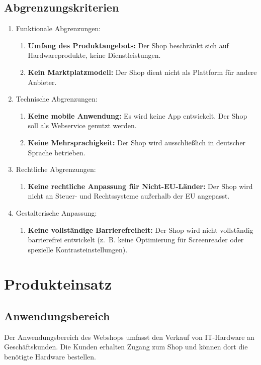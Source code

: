 \documentclass[%
	ngerman,
	12pt,
	a4paper,
	oneside,
	parskip=full
]{scrbook}
\begin{document}
\section{Abgrenzungskriterien}
\begin{enumerate}
	\item Funktionale Abgrenzungen:
	\begin{enumerate}
		\item \textbf{Umfang des Produktangebots:} Der Shop beschränkt sich auf Hardwareprodukte, keine Dienstleistungen.
		\item \textbf{Kein Marktplatzmodell:} Der Shop dient nicht als Plattform für andere Anbieter.
	\end{enumerate}
	\item Technische Abgrenzungen:
	\begin{enumerate}
		\item \textbf{Keine mobile Anwendung:} Es wird keine App entwickelt. Der Shop soll als Webservice genutzt werden.
		\item \textbf{Keine Mehrsprachigkeit:} Der Shop wird ausschließlich in deutscher Sprache betrieben.
	\end{enumerate}
	\item Rechtliche Abgrenzungen:
	\begin{enumerate}
		\item \textbf{Keine rechtliche Anpassung für Nicht-EU-Länder:} Der Shop wird nicht an Steuer- und Rechtssysteme außerhalb der EU angepasst.
	\end{enumerate}
	\item Gestalterische Anpassung:
	\begin{enumerate}
		\item \textbf{Keine vollständige Barrierefreiheit:} Der Shop wird nicht vollständig barrierefrei entwickelt (z.~B. keine Optimierung für Screenreader oder spezielle Kontrasteinstellungen).
	\end{enumerate}
\end{enumerate}

\chapter{Produkteinsatz}
\section{Anwendungsbereich}
Der Anwendungsbereich des Webshops umfasst den Verkauf von IT-Hardware an Geschäftskunden.
Die Kunden erhalten Zugang zum Shop und können dort die benötigte Hardware bestellen.
\end{document}
